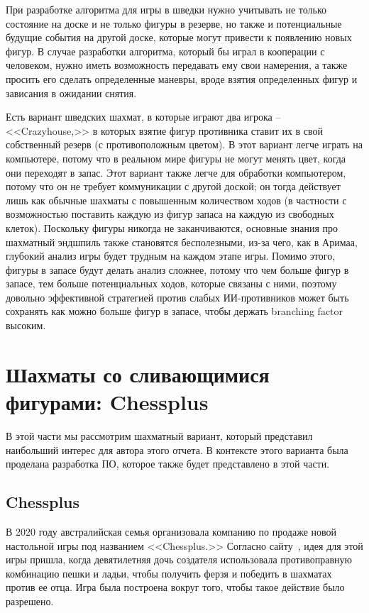 \documentclass{article}
\begin{document}
При разработке алгоритма для игры в шведки нужно учитывать не только состояние на доске
и не только фигуры в резерве,
но также и потенциальные будущие события на другой доске,
которые могут привести к появлению новых фигур.
В случае разработки алгоритма, который бы играл в кооперации с человеком,
нужно иметь возможность передавать ему свои намерения,
а также просить его сделать определенные маневры,
вроде взятия определенных фигур и зависания в ожидании снятия.

Есть вариант шведских шахмат, в которые играют два игрока -- <<Crazyhouse,>>
в которых взятие фигур противника ставит их в свой собственный резерв (с противоположным цветом).
В этот вариант легче играть на компьютере, потому что в реальном мире фигуры не могут менять цвет, когда они переходят в запас.
Этот вариант также легче для обработки компьютером, потому что он не требует
коммуникации с другой доской;
он тогда действует лишь как обычные шахматы с повышенным количеством ходов (в частности с возможностью поставить каждую из фигур запаса на каждую из свободных клеток).
Поскольку фигуры никогда не заканчиваются,
основные знания про шахматный эндшпиль также становятся бесполезными,
из-за чего, как в Аримаа, глубокий анализ игры будет трудным на каждом этапе игры.
Помимо этого, фигуры в запасе будут делать анализ сложнее,
потому что чем больше фигур в запасе, тем больше потенциальных ходов, которые связаны с ними,
поэтому довольно эффективной стратегией против слабых ИИ-противников может быть сохранять как можно больше фигур в запасе,
чтобы держать branching factor высоким.

\section{Шахматы со сливающимися фигурами: Chessplus}

В этой части мы рассмотрим шахматный вариант,
который представил наибольший интерес для автора этого отчета.
В контексте этого варианта была проделана разработка ПО,
которое также будет представлено в этой части.

\subsection{Chessplus}

В 2020 году австралийская семья организовала компанию по продаже новой настольной игры под названием <<Chessplus.>> 
Согласно сайту~\cite{chessplus-site}, идея для этой игры пришла, когда девятилетняя дочь создателя использовала противоправную комбинацию пешки и ладьи,
чтобы получить ферзя и победить в шахматах против ее отца.
Игра была построена вокруг того, чтобы такое действие было разрешено.
\end{document}

